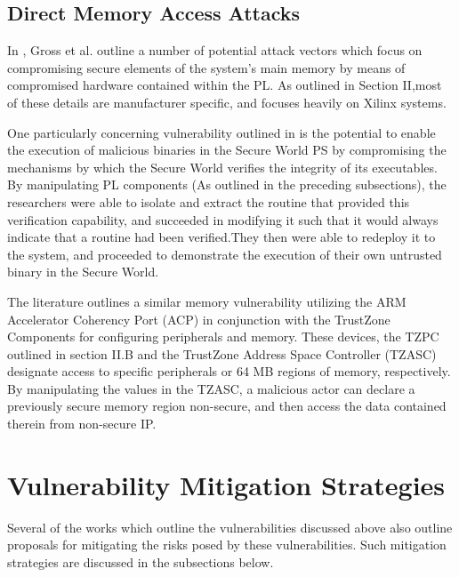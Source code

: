 \documentclass[journal]{IEEEtran}
\begin{document}
\subsection{Direct Memory Access Attacks}
In \cite{gross_breaking_2019}, Gross et al. outline a number of potential attack vectors
which focus on compromising secure elements of the system's main memory by means of 
compromised hardware contained within the PL. As outlined in Section II,most of these
details are manufacturer specific, and \cite{gross_breaking_2019} focuses heavily on
Xilinx systems.

One particularly concerning vulnerability outlined in \cite{gross_breaking_2019} is the
potential to enable the execution of malicious binaries in the Secure World PS by 
compromising the mechanisms by which the Secure World verifies the integrity of its
executables. By manipulating PL components (As outlined in the preceding subsections),
the researchers were able to isolate and extract the routine that provided this
verification capability, and succeeded in modifying it such that it would always indicate
that a routine had been verified.They then were able to redeploy it to the system, and
proceeded to demonstrate the execution of their own untrusted binary in the Secure World.

The literature \cite{benhani_security_2019} outlines a similar memory vulnerability
utilizing the ARM Accelerator Coherency Port (ACP) in conjunction with the TrustZone
Components for configuring peripherals and memory. These devices, the TZPC outlined in 
section II.B and the TrustZone Address Space Controller (TZASC) designate access to
specific peripherals or 64 MB regions of memory, respectively. By manipulating the values
in the TZASC, a malicious actor can declare a previously secure memory region non-secure,
and then access the data contained therein from non-secure IP.

\section{Vulnerability Mitigation Strategies}
Several of the works which outline the vulnerabilities discussed above also outline
proposals for mitigating the risks posed by these vulnerabilities. Such mitigation
strategies are discussed in the subsections below.
\end{document}
